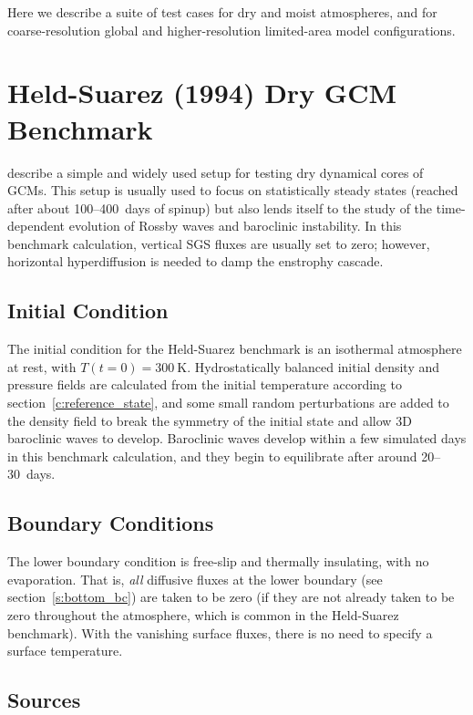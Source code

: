 \documentclass{report}
\begin{document}
Here we describe a suite of test cases for dry and moist atmospheres, and for coarse-resolution global and higher-resolution limited-area model configurations. 

\section{Held-Suarez (1994) Dry GCM Benchmark}

\citet{Held94} describe a simple and widely used setup for testing dry dynamical cores of GCMs. This setup is usually used to focus on statistically steady states (reached after about 100--400~days of spinup) but also lends itself to the study of the time-dependent evolution of Rossby waves and baroclinic instability. In this benchmark calculation, vertical SGS fluxes are usually set to zero; however, horizontal hyperdiffusion is needed to damp the enstrophy cascade. 

\subsection{Initial Condition}

The initial condition for the Held-Suarez benchmark is an isothermal atmosphere at rest, with $T(t=0) = 300~\mathrm{K}$. Hydrostatically balanced initial density and pressure fields are calculated from the initial temperature according to section~\ref{c:reference_state}, and some small random perturbations are added to the density field to break the symmetry of the initial state and allow 3D baroclinic waves to develop. Baroclinic waves develop within a few simulated days in this benchmark calculation, and they begin to equilibrate after around 20--30~days. 

\subsection{Boundary Conditions}

The lower boundary condition is free-slip and thermally insulating, with no evaporation. That is, \emph{all} diffusive fluxes at the lower boundary (see section~\ref{s:bottom_bc}) are taken to be zero (if they are not already taken to be zero throughout the atmosphere, which is common in the Held-Suarez benchmark). With the vanishing surface fluxes, there is no need to specify a surface temperature.

\subsection{Sources}
\end{document}
